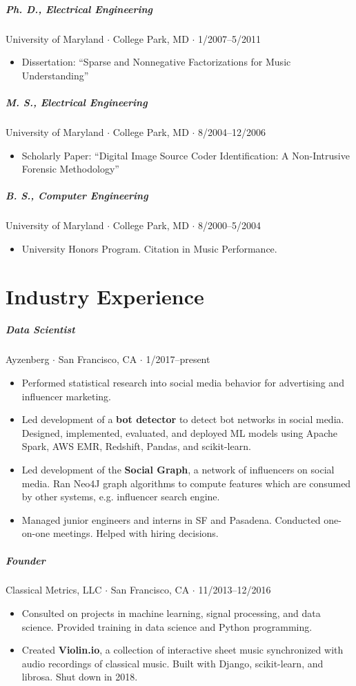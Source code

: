 \documentclass[10pt,letterpaper]{article}
\begin{document}
\subparagraph{Ph. D., Electrical Engineering}
University of Maryland $\cdot$ College Park, MD $\cdot$ 1/2007--5/2011
\begin{itemize}
    \item Dissertation: ``Sparse and Nonnegative Factorizations for Music Understanding''
\end{itemize}

\subparagraph{M. S., Electrical Engineering}
University of Maryland $\cdot$ College Park, MD $\cdot$ 8/2004--12/2006
\begin{itemize}
    \item Scholarly Paper: ``Digital Image Source Coder Identification: A Non-Intrusive Forensic Methodology''
\end{itemize}

\subparagraph{B. S., Computer Engineering}
University of Maryland $\cdot$ College Park, MD $\cdot$ 8/2000--5/2004
\begin{itemize}
    \item University Honors Program.  Citation in Music Performance.
\end{itemize}


\section*{Industry Experience}

\subparagraph{Data Scientist}
Ayzenberg $\cdot$ San Francisco, CA $\cdot$ 1/2017--present
\begin{itemize}
    \item Performed statistical research into social media behavior for advertising and influencer marketing.
    \item Led development of a \textbf{bot detector} to detect bot networks in social media. Designed, implemented, evaluated, and deployed ML models using Apache Spark, AWS EMR, Redshift, Pandas, and scikit-learn.
    \item Led development of the \textbf{Social Graph}, a network of influencers on social media. Ran Neo4J graph algorithms to compute features which are consumed by other systems, e.g. influencer search engine.
    \item Managed junior engineers and interns in SF and Pasadena. Conducted one-on-one meetings. Helped with hiring decisions.
\end{itemize}


\subparagraph{Founder}
Classical Metrics, LLC $\cdot$ San Francisco, CA $\cdot$ 11/2013--12/2016
\begin{itemize}
    \item Consulted on projects in machine learning, signal processing, and data science. Provided training in data science and Python programming.
    \item Created \textbf{Violin.io}, a collection of interactive sheet music synchronized with audio recordings of classical music. Built with Django, scikit-learn, and librosa. Shut down in 2018.
\end{itemize}
\end{document}
